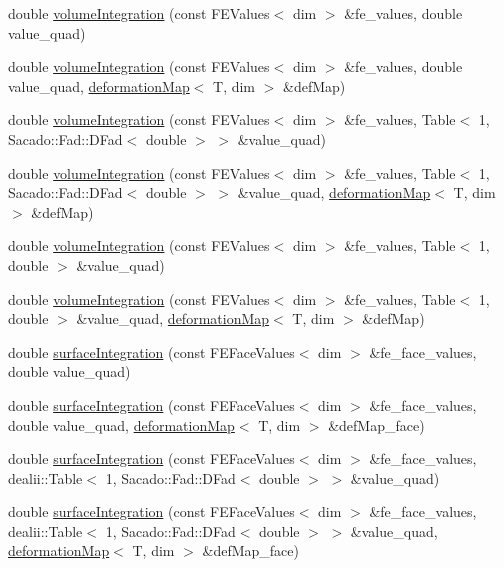 \begin{DoxyCompactItemize}
\item 
double \mbox{\hyperlink{class_residual_a8ac0b75533aa9e599cc3c623e57fa5aa}{volume\+Integration}} (const F\+E\+Values$<$ dim $>$ \&fe\+\_\+values, double value\+\_\+quad)
\item 
double \mbox{\hyperlink{class_residual_ad535764375d2690424b1545898b8a168}{volume\+Integration}} (const F\+E\+Values$<$ dim $>$ \&fe\+\_\+values, double value\+\_\+quad, \mbox{\hyperlink{structdeformation_map}{deformation\+Map}}$<$ T, dim $>$ \&def\+Map)
\item 
double \mbox{\hyperlink{class_residual_ab9fdc6a8b102af5beaa1e4eb6fb7fa40}{volume\+Integration}} (const F\+E\+Values$<$ dim $>$ \&fe\+\_\+values, Table$<$ 1, Sacado\+::\+Fad\+::\+D\+Fad$<$ double $>$ $>$ \&value\+\_\+quad)
\item 
double \mbox{\hyperlink{class_residual_a50acc2c1f154889f83606a2b2e2d555c}{volume\+Integration}} (const F\+E\+Values$<$ dim $>$ \&fe\+\_\+values, Table$<$ 1, Sacado\+::\+Fad\+::\+D\+Fad$<$ double $>$ $>$ \&value\+\_\+quad, \mbox{\hyperlink{structdeformation_map}{deformation\+Map}}$<$ T, dim $>$ \&def\+Map)
\item 
double \mbox{\hyperlink{class_residual_a734c1bb6a4a56aa1c774485441e47340}{volume\+Integration}} (const F\+E\+Values$<$ dim $>$ \&fe\+\_\+values, Table$<$ 1, double $>$ \&value\+\_\+quad)
\item 
double \mbox{\hyperlink{class_residual_ae097f5d9f2a92108cb0a1c7ecf4510c3}{volume\+Integration}} (const F\+E\+Values$<$ dim $>$ \&fe\+\_\+values, Table$<$ 1, double $>$ \&value\+\_\+quad, \mbox{\hyperlink{structdeformation_map}{deformation\+Map}}$<$ T, dim $>$ \&def\+Map)
\item 
double \mbox{\hyperlink{class_residual_ac48cd0a04f0d2f91a23e60135652d938}{surface\+Integration}} (const F\+E\+Face\+Values$<$ dim $>$ \&fe\+\_\+face\+\_\+values, double value\+\_\+quad)
\item 
double \mbox{\hyperlink{class_residual_ad44c10c32c915ba9b431c0256a2769c2}{surface\+Integration}} (const F\+E\+Face\+Values$<$ dim $>$ \&fe\+\_\+face\+\_\+values, double value\+\_\+quad, \mbox{\hyperlink{structdeformation_map}{deformation\+Map}}$<$ T, dim $>$ \&def\+Map\+\_\+face)
\item 
double \mbox{\hyperlink{class_residual_a6753ecdc0e19b7bac24615d47889ae65}{surface\+Integration}} (const F\+E\+Face\+Values$<$ dim $>$ \&fe\+\_\+face\+\_\+values, dealii\+::\+Table$<$ 1, Sacado\+::\+Fad\+::\+D\+Fad$<$ double $>$ $>$ \&value\+\_\+quad)
\item 
double \mbox{\hyperlink{class_residual_a71923ccf434fa6503c37afd0ca7d0100}{surface\+Integration}} (const F\+E\+Face\+Values$<$ dim $>$ \&fe\+\_\+face\+\_\+values, dealii\+::\+Table$<$ 1, Sacado\+::\+Fad\+::\+D\+Fad$<$ double $>$ $>$ \&value\+\_\+quad, \mbox{\hyperlink{structdeformation_map}{deformation\+Map}}$<$ T, dim $>$ \&def\+Map\+\_\+face)

\end{DoxyCompactItemize}
